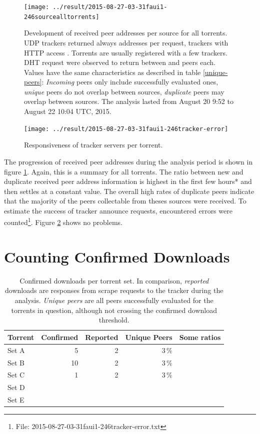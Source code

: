 \documentclass[10pt, a4paper, twoside, headsepline]{scrbook}
\renewcommand{\_}{\origunderscore\allowbreak}
\newcommand{\range}{from August 20 9:52 to August 22 10:04 UTC, 2015} %
\begin{document}
\begin{figure}
\centering
\texttt{[image: ../result/2015-08-27\_21-03-31\_faui1-246\_source\_all\_torrents]}
\caption[Development of received peer addresses per source]{Development of received peer addresses per source for all torrents. UDP trackers returned always  addresses per request, trackers with HTTP access . Torrents are usually registered with a few trackers. DHT request were observed to return between  and  peers each. Values have the same characteristics as described in table \ref{unique-peers}: \emph{Incoming} peers only include successfully evaluated ones, \emph{unique} peers do not overlap between sources, \emph{duplicate} peers may overlap between sources. The analysis lasted \range.}
\label{request-history}
\end{figure}

\begin{figure}
\centering
\texttt{[image: ../result/2015-08-27\_21-03-31\_faui1-246\_tracker-error]}
\caption[Responsiveness of tracker servers]{Responsiveness of tracker servers per torrent.}
\label{tracker-resp}
\end{figure}

The progression of received peer addresses during the analysis period is shown in figure \ref{request-history}. Again, this is a summary for all torrents. The ratio between new and duplicate received peer address information is highest in the first few hours* and then settles at a constant value. The overall high rates of duplicate peers indicate that the majority of the peers collectable from theses sources were received. To estimate the success of tracker announce requests, encountered errors were counted\footnote{File: 2015-08-27\_21-03-31\_faui1-246\_tracker-error.txt}. Figure \ref{tracker-resp} shows no problems.

\section{Counting Confirmed Downloads}
\begin{table}
\centering
\begin{tabular}{lrrrr}
\toprule
Torrent & Confirmed & Reported & Unique Peers & Some ratios \\
\midrule
Set A & 5 & 2 & 3\,\% \\
Set B & 10 & 2 & 3\,\% \\
Set C & 1 & 2 & 3\,\% \\
Set D & \\
Set E & \\
\bottomrule
\end{tabular}
\caption[Confirmed downloads per torrent set]{Confirmed downloads per torrent set. In comparison, \emph{reported} downloads are responses from scrape requests to the tracker during the analysis. \emph{Unique peers} are all peers successfully evaluated for the torrents in question, although not crossing the confirmed download threshold.}
\label{confirmed-downloads}
\end{table}
\end{document}
